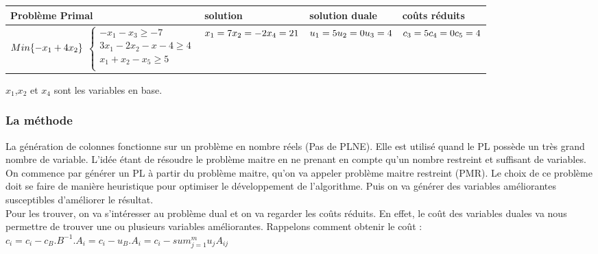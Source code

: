 \begin{tabular}{ p{5 cm}p{3 cm}p{3 cm}p{3 cm}}
 \hline
Problème Primal  & solution & solution duale & coûts réduits \\
 \hline
$Min\{-x_1 + 4x_2\} \newline$
$\left\lbrace
\begin{array}{l}
-x_1 -x_3\geq -7\\
3x_1-2x_2 -x -4\geq 4\\
x_1+x_2 -x_5 \geq 5\\
\end{array}
\right.$
& $x_1 = 7 \newline x_2 = -2 \newline x_4 = 21$ & $u_1 = 5 \newline u_2 = 0 \newline u_3 = 4$ & $c_3 = 5 \newline c_4 = 0 \newline c_5 = 4$ \\
 \hline
\end{tabular}

$x_1$,$x_2$ et $x_4$ sont les variables en base.
\subsubsection{La méthode}
La génération de colonnes fonctionne sur un problème en nombre réels (Pas de PLNE). Elle est utilisé quand le PL possède un très grand nombre de variable. L'idée étant de résoudre le problème maitre en ne prenant en compte qu'un nombre restreint et suffisant de variables.\\

On commence par générer un PL à partir du problème maitre, qu'on va appeler problème maitre restreint (PMR). Le choix de ce problème doit se faire de manière heuristique pour optimiser le développement de l'algorithme. Puis on va générer des variables améliorantes susceptibles d'améliorer le résultat.\\

Pour les trouver, on va s'intéresser  au problème dual et on va regarder les coûts réduits. En effet, le coût des variables duales va nous permettre de trouver une ou plusieurs variables améliorantes.
Rappelons comment obtenir le coût :\\
\hspace*{2.5cm}$c_i = c_i - c_B.B^{-1}.A_i = c_i - u_B.A_i = c_i - sum_{j=1}^{m}{u_j A_{ij}}$\\

